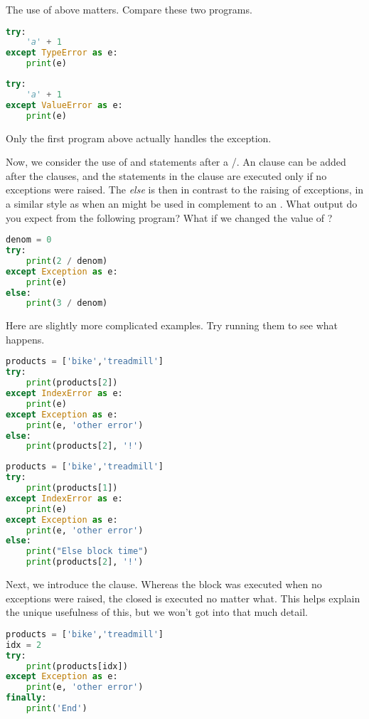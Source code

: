 \smallskip
\noindent The use of  above matters. Compare these two programs.

\begin{lstlisting}[language = Python]
try:
    'a' + 1
except TypeError as e:
    print(e)\end{lstlisting}
    
\begin{lstlisting}[language = Python]
try:
    'a' + 1
except ValueError as e:
    print(e)\end{lstlisting}
    
\smallskip
\noindent Only the first program above actually handles the exception. 


\smallskip
\noindent Now, we consider the use of  and  statements after a /. An  clause can be added after the  clauses, and the statements in the  clause are executed only if no exceptions were raised. The \emph{else} is then in contrast to the raising of exceptions, in a similar style as when an  might be used in complement to an . What output do you expect from the following program? What if we changed the value of ?

\begin{lstlisting}[language = Python]
denom = 0
try:
    print(2 / denom)
except Exception as e:
    print(e)
else:
    print(3 / denom) \end{lstlisting}

\smallskip
\noindent Here are slightly more complicated examples. Try running them to see what happens.

\begin{lstlisting}[language = Python]
products = ['bike','treadmill']
try:
    print(products[2])
except IndexError as e:
    print(e)
except Exception as e:
    print(e, 'other error')
else:
    print(products[2], '!') \end{lstlisting}
    
\begin{lstlisting}[language = Python]
products = ['bike','treadmill']
try:
    print(products[1])
except IndexError as e:
    print(e)
except Exception as e:
    print(e, 'other error')
else:
    print("Else block time")
    print(products[2], '!') \end{lstlisting}
    
    
\smallskip
\noindent Next, we introduce the  clause. Whereas the  block was executed when no exceptions were raised, the  closed is executed no matter what. This  helps explain the unique usefulness of this, but we won't got into that much detail.

\begin{lstlisting}[language = Python]
products = ['bike','treadmill']
idx = 2
try:
    print(products[idx])
except Exception as e:
    print(e, 'other error')
finally:
    print('End') \end{lstlisting}
